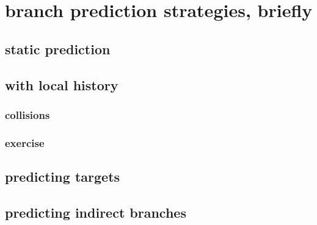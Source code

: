 \section{branch prediction strategies, briefly}

\subsection{static prediction}



\subsection{with local history}


\subsubsection{collisions}


%

\subsubsection{exercise}


\subsection{predicting targets}


\subsection{predicting indirect branches}

